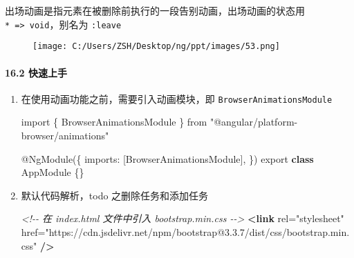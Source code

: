 \documentclass[
]{article}
\newenvironment{Shaded}{}{}
\newcommand{\CommentTok}[1]{\textcolor[rgb]{0.38,0.63,0.69}{\textit{#1}}}
\newcommand{\DataTypeTok}[1]{\textcolor[rgb]{0.56,0.13,0.00}{#1}}
\newcommand{\FunctionTok}[1]{\textcolor[rgb]{0.02,0.16,0.49}{#1}}
\newcommand{\ImportTok}[1]{#1}
\newcommand{\KeywordTok}[1]{\textcolor[rgb]{0.00,0.44,0.13}{\textbf{#1}}}
\newcommand{\NormalTok}[1]{#1}
\newcommand{\OperatorTok}[1]{\textcolor[rgb]{0.40,0.40,0.40}{#1}}
\newcommand{\OtherTok}[1]{\textcolor[rgb]{0.00,0.44,0.13}{#1}}
\newcommand{\StringTok}[1]{\textcolor[rgb]{0.25,0.44,0.63}{#1}}
\begin{document}
出场动画是指元素在被删除前执行的一段告别动画，出场动画的状态用
\texttt{*\ =\textgreater{}\ void}，别名为 \texttt{:leave}

\begin{figure}
\centering
\texttt{[image: C:/Users/ZSH/Desktop/ng/ppt/images/53.png]}
\caption{}
\end{figure}

\hypertarget{162-ux5febux901fux4e0aux624b}{%
\paragraph{16.2 快速上手}\label{162-ux5febux901fux4e0aux624b}}

\begin{enumerate}
\def\labelenumi{\arabic{enumi}.}
\item
  在使用动画功能之前，需要引入动画模块，即
  \texttt{BrowserAnimationsModule}

\begin{Shaded}
\begin{Highlighting}[]
\ImportTok{import}\NormalTok{ \{ BrowserAnimationsModule \} }\ImportTok{from} \StringTok{"@angular/platform{-}browser/animations"}

\NormalTok{@}\FunctionTok{NgModule}\NormalTok{(\{}
  \DataTypeTok{imports}\OperatorTok{:}\NormalTok{ [BrowserAnimationsModule]}\OperatorTok{,}
\NormalTok{\})}
\ImportTok{export} \KeywordTok{class}\NormalTok{ AppModule \{\}}
\end{Highlighting}
\end{Shaded}
\item
  默认代码解析，todo 之删除任务和添加任务

\begin{Shaded}
\begin{Highlighting}[]
\CommentTok{\textless{}!{-}{-} 在 index.html 文件中引入 bootstrap.min.css {-}{-}\textgreater{}}
\KeywordTok{\textless{}link}\OtherTok{ rel=}\StringTok{"stylesheet"}\OtherTok{ href=}\StringTok{"https://cdn.jsdelivr.net/npm/bootstrap@3.3.7/dist/css/bootstrap.min.css"} \KeywordTok{/\textgreater{}}
\end{Highlighting}
\end{Shaded}


\end{enumerate}
\end{document}
